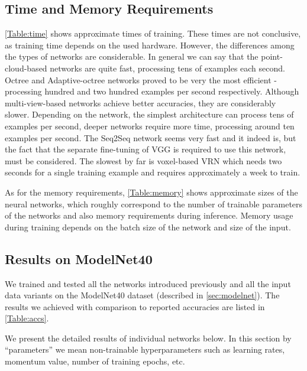 \subsection{Time and Memory Requirements}
\autoref{Table:time} shows approximate times of training. These times are not conclusive, as training time depends on the used hardware. However, the differences among the types of networks are considerable. In general we can say that the point-cloud-based networks are quite fast, processing tens of examples each second. Octree and Adaptive-octree networks proved to be very the most efficient - processing hundred and two hundred examples per second respectively. Although multi-view-based networks achieve better accuracies, they are considerably slower. Depending on the network, the simplest architecture can process tens of examples per second, deeper networks require more time, processing around ten examples per second. The Seq2Seq network seems very fast and it indeed is, but the fact that the separate fine-tuning of VGG is required to use this network, must be considered. The slowest by far is voxel-based VRN which needs two seconds for a single training example and requires approximately a week to train. \par


As for the memory requirements, \autoref{Table:memory} shows approximate sizes of the neural networks, which roughly correspond to the number of trainable parameters of the networks and also memory requirements during inference. Memory usage during training depends on the batch size of the network and size of the input.


\subsection{Results on ModelNet40}
We trained and tested all the networks introduced previously and all the input data variants on the ModelNet40 dataset (described in \autoref{sec:modelnet}). The results we achieved with comparison to reported accuracies are listed in \autoref{Table:accs}. 

We present the detailed results of individual networks below. In this section by “parameters” we mean non-trainable hyperparameters such as learning rates, momentum value, number of training epochs, etc.

\def\myitem #1#2{
	\item { \textbf{#1} \par #2
	}
}

